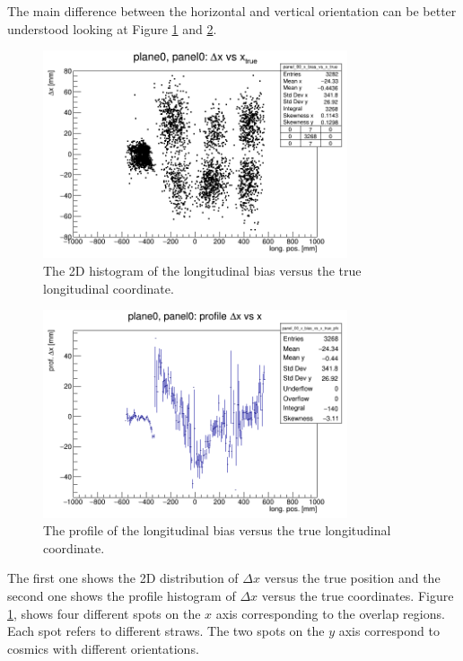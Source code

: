 The main difference between the horizontal and vertical orientation can be better 
understood looking at Figure \ref{fig:rec2D} and \ref{fig:profile}. 
\begin{figure}[!h]
    \centering
    \includegraphics[width=0.8\textwidth]{figures/png/panel_00_x_bias_vs_x.png}
    \caption[The 2D histogram of the longitudinal bias versus the true coordinate.]{The 2D histogram of 
    the longitudinal bias versus the true longitudinal coordinate.}
    \label{fig:rec2D}
\end{figure}
\begin{figure}[!h]
    \centering
    \includegraphics[width=0.8\textwidth]{figures/png/panel_00_x_bias_vs_x_prof.png}
    \caption[The profile of the longitudinal bias versus the true longitudinal coordinate.]{The profile of the longitudinal bias versus the true longitudinal coordinate.}
    \label{fig:profile}
\end{figure}
The first one shows the 2D distribution of $\Delta x$ 
versus the true position and the second one shows the profile histogram of $\Delta x$ versus 
the true coordinates. 
Figure \ref{fig:rec2D}, shows four different 
spots on the $x$ axis corresponding to 
the overlap regions. Each spot refers to 
different straws. The two spots on the $y$ 
axis correspond to cosmics with different orientations. 

